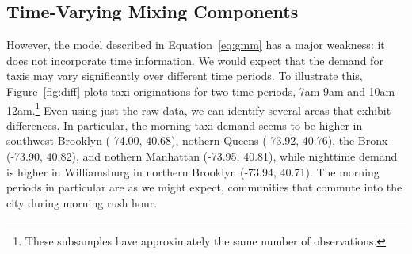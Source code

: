 \documentclass[12pt]{article}
\theoremstyle{definition}
\theoremstyle{algodesc}
\begin{document}
\subsection{Time-Varying Mixing Components}
However, the model described in Equation~\ref{eq:gmm} has a major weakness: it does not incorporate time information. We would expect that the demand for taxis may vary significantly over different time periods. To illustrate this, Figure~\ref{fig:diff} plots taxi originations for two time periods, 7am-9am and 10am-12am.\footnote{These subsamples have approximately the same number of observations.} Even using just the raw data, we can identify several areas that exhibit differences. In particular, the morning taxi demand seems to be higher in southwest Brooklyn (-74.00, 40.68), nothern Queens (-73.92, 40.76), the Bronx (-73.90, 40.82), and nothern Manhattan (-73.95, 40.81), while nighttime demand is higher in Williamsburg in northern Brooklyn (-73.94, 40.71). The morning periods in particular are as we might expect, communities that commute into the city during morning rush hour.
\end{document}
